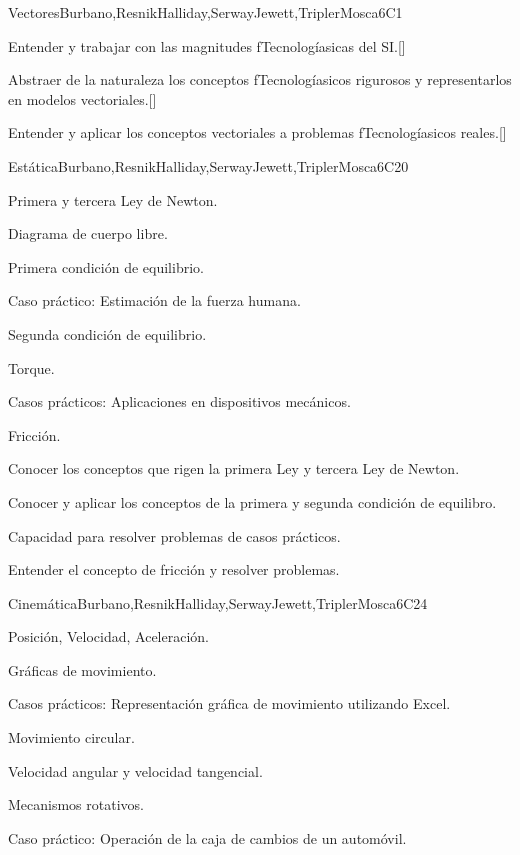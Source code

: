 \begin{syllabus}
\begin{unit}{}{Vectores}{Burbano,ResnikHalliday,SerwayJewett,TriplerMosca}{6}{C1}
   \begin{learningoutcomes}
      \item Entender y trabajar con las magnitudes fTecnologíasicas del SI.[\Usage]
      \item Abstraer de la naturaleza los conceptos fTecnologíasicos rigurosos y representarlos en modelos vectoriales.[\Usage]
      \item Entender y aplicar los conceptos vectoriales a problemas fTecnologíasicos reales.[\Usage]
   \end{learningoutcomes}
\end{unit}

\begin{unit}{}{Estática}{Burbano,ResnikHalliday,SerwayJewett,TriplerMosca}{6}{C20}
\begin{topics}
      \item Primera y tercera Ley de Newton.
      \item Diagrama de cuerpo libre.
      \item Primera condición de equilibrio.
      \item Caso práctico: Estimación de la fuerza humana.
      \item Segunda condición de equilibrio.
      \item Torque.
      \item Casos prácticos: Aplicaciones en dispositivos mecánicos.
      \item Fricción.
    \end{topics}
   \begin{learningoutcomes}
      \item Conocer los conceptos que rigen la primera Ley y tercera Ley de Newton.
      \item Conocer y aplicar los conceptos de la primera y segunda condición de equilibro.
      \item Capacidad para resolver problemas de casos prácticos.
      \item Entender el concepto de fricción y resolver problemas.
   \end{learningoutcomes}
\end{unit}

\begin{unit}{}{Cinemática}{Burbano,ResnikHalliday,SerwayJewett,TriplerMosca}{6}{C24}
\begin{topics}
      \item Posición, Velocidad, Aceleración.
      \item Gráficas de movimiento.
      \item Casos prácticos: Representación gráfica de movimiento utilizando Excel.
      \item Movimiento circular.
      \item Velocidad angular y velocidad tangencial.
      \item Mecanismos rotativos.
      \item Caso práctico: Operación de la caja de cambios de un automóvil.
   \end{topics}


\end{unit}
\end{syllabus}
